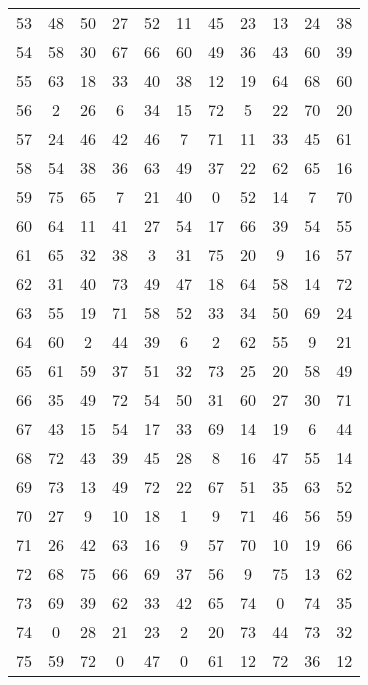 \begin{table}
\begin{tabular}{c c c c c c c c c c c }
53 & 48 & 50 & 27 & 52 & 11 & 45 & 23 & 13 & 24 & 38 \\
54 & 58 & 30 & 67 & 66 & 60 & 49 & 36 & 43 & 60 & 39 \\
55 & 63 & 18 & 33 & 40 & 38 & 12 & 19 & 64 & 68 & 60 \\
56 & 2 & 26 & 6 & 34 & 15 & 72 & 5 & 22 & 70 & 20 \\
57 & 24 & 46 & 42 & 46 & 7 & 71 & 11 & 33 & 45 & 61 \\
58 & 54 & 38 & 36 & 63 & 49 & 37 & 22 & 62 & 65 & 16 \\
59 & 75 & 65 & 7 & 21 & 40 & 0 & 52 & 14 & 7 & 70 \\
60 & 64 & 11 & 41 & 27 & 54 & 17 & 66 & 39 & 54 & 55 \\
61 & 65 & 32 & 38 & 3 & 31 & 75 & 20 & 9 & 16 & 57 \\
62 & 31 & 40 & 73 & 49 & 47 & 18 & 64 & 58 & 14 & 72 \\
63 & 55 & 19 & 71 & 58 & 52 & 33 & 34 & 50 & 69 & 24 \\
64 & 60 & 2 & 44 & 39 & 6 & 2 & 62 & 55 & 9 & 21 \\
65 & 61 & 59 & 37 & 51 & 32 & 73 & 25 & 20 & 58 & 49 \\
66 & 35 & 49 & 72 & 54 & 50 & 31 & 60 & 27 & 30 & 71 \\
67 & 43 & 15 & 54 & 17 & 33 & 69 & 14 & 19 & 6 & 44 \\
68 & 72 & 43 & 39 & 45 & 28 & 8 & 16 & 47 & 55 & 14 \\
69 & 73 & 13 & 49 & 72 & 22 & 67 & 51 & 35 & 63 & 52 \\
70 & 27 & 9 & 10 & 18 & 1 & 9 & 71 & 46 & 56 & 59 \\
71 & 26 & 42 & 63 & 16 & 9 & 57 & 70 & 10 & 19 & 66 \\
72 & 68 & 75 & 66 & 69 & 37 & 56 & 9 & 75 & 13 & 62 \\
73 & 69 & 39 & 62 & 33 & 42 & 65 & 74 & 0 & 74 & 35 \\
74 & 0 & 28 & 21 & 23 & 2 & 20 & 73 & 44 & 73 & 32 \\
75 & 59 & 72 & 0 & 47 & 0 & 61 & 12 & 72 & 36 & 12 \\
\hline
\end{tabular}
\end{table}